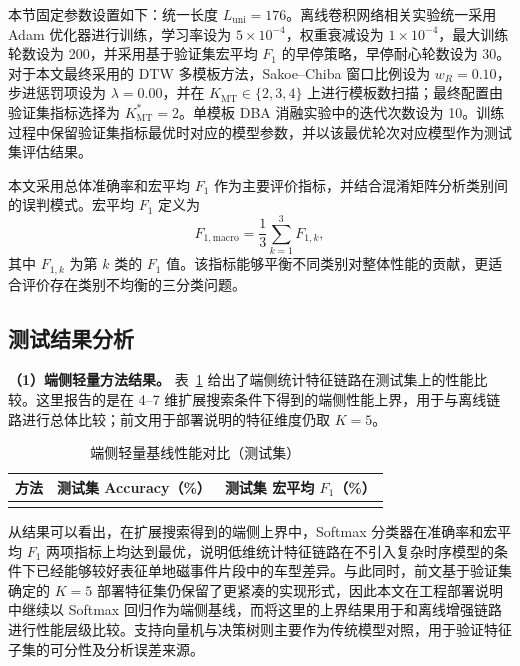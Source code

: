 本节固定参数设置如下：统一长度 $L_{\mathrm{uni}}=176$。离线卷积网络相关实验统一采用 Adam 优化器进行训练，学习率设为 $5\times10^{-4}$，权重衰减设为 $1\times10^{-4}$，最大训练轮数设为 200，并采用基于验证集宏平均 $F_1$ 的早停策略，早停耐心轮数设为 30。对于本文最终采用的 DTW 多模板方法，Sakoe--Chiba 窗口比例设为 $w_R=0.10$，步进惩罚项设为 $\lambda=0.00$，并在 $K_{\mathrm{MT}}\in\{2,3,4\}$ 上进行模板数扫描；最终配置由验证集指标选择为 $K_{\mathrm{MT}}^\ast=2$。单模板 DBA 消融实验中的迭代次数设为 10。训练过程中保留验证集指标最优时对应的模型参数，并以该最优轮次对应模型作为测试集评估结果。

本文采用总体准确率和宏平均 $F_1$ 作为主要评价指标，并结合混淆矩阵分析类别间的误判模式。宏平均 $F_1$ 定义为
\begin{equation}
    F_{1,\mathrm{macro}}=\frac{1}{3}\sum_{k=1}^{3}F_{1,k},
\end{equation}
其中 $F_{1,k}$ 为第 $k$ 类的 $F_1$ 值。该指标能够平衡不同类别对整体性能的贡献，更适合评价存在类别不均衡的三分类问题。

\subsection{测试结果分析}
\label{subsec:ch3_exp_result}

\textbf{（1）端侧轻量方法结果。}
表~\ref{tab:ch3_edge} 给出了端侧统计特征链路在测试集上的性能比较。这里报告的是在 4--7 维扩展搜索条件下得到的端侧性能上界，用于与离线链路进行总体比较；前文用于部署说明的特征维度仍取 $K=5$。

\begin{table}[!htbp]
\centering
\small
\caption{端侧轻量基线性能对比（测试集）}
\label{tab:ch3_edge}
\begin{tabular}{lcc}
\hline
方法 & 测试集 Accuracy（\%） & 测试集 宏平均 $F_1$（\%） \\
\hline
\\
\hline
\end{tabular}
\end{table}

从结果可以看出，在扩展搜索得到的端侧上界中，Softmax 分类器在准确率和宏平均 $F_1$ 两项指标上均达到最优，说明低维统计特征链路在不引入复杂时序模型的条件下已经能够较好表征单地磁事件片段中的车型差异。与此同时，前文基于验证集确定的 $K=5$ 部署特征集仍保留了更紧凑的实现形式，因此本文在工程部署说明中继续以 Softmax 回归作为端侧基线，而将这里的上界结果用于和离线增强链路进行性能层级比较。支持向量机与决策树则主要作为传统模型对照，用于验证特征子集的可分性及分析误差来源。

